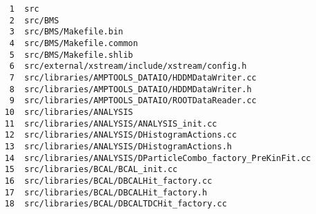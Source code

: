 \small
\begin{verbatim}
     1	src
     2	src/BMS
     3	src/BMS/Makefile.bin
     4	src/BMS/Makefile.common
     5	src/BMS/Makefile.shlib
     6	src/external/xstream/include/xstream/config.h
     7	src/libraries/AMPTOOLS_DATAIO/HDDMDataWriter.cc
     8	src/libraries/AMPTOOLS_DATAIO/HDDMDataWriter.h
     9	src/libraries/AMPTOOLS_DATAIO/ROOTDataReader.cc
    10	src/libraries/ANALYSIS
    11	src/libraries/ANALYSIS/ANALYSIS_init.cc
    12	src/libraries/ANALYSIS/DHistogramActions.cc
    13	src/libraries/ANALYSIS/DHistogramActions.h
    14	src/libraries/ANALYSIS/DParticleCombo_factory_PreKinFit.cc
    15	src/libraries/BCAL/BCAL_init.cc
    16	src/libraries/BCAL/DBCALHit_factory.cc
    17	src/libraries/BCAL/DBCALHit_factory.h
    18	src/libraries/BCAL/DBCALTDCHit_factory.cc
\end{verbatim}
